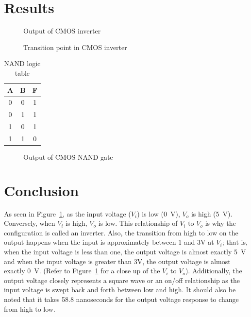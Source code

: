 \newpage

\section{Results}
\label{sec:results}

\begin{figure}[hbtp]
  \centering
  \resizebox{1.0\textwidth}{!}{}
  \caption{\label{fig:inverter} Output of CMOS inverter}
\end{figure}

\begin{figure}[hbtp]
  \centering
  \resizebox{1.0\textwidth}{!}{}
  \caption{\label{fig:data2} Transition point in CMOS inverter}
\end{figure}


\begin{table}[hbtp]
  \centering
  \begin{tabular}{cc|c}
    A & B & F \\
    \hline
    0 & 0 & 1 \\
    0 & 1 & 1 \\
    1 & 0 & 1 \\
    1 & 1 & 0 \\
  \end{tabular}
  \caption{\label{tab:nand} NAND logic table}
  \end{table}

\begin{figure}[hbtp]
  \centering
  \resizebox{1.0\textwidth}{!}{}
  \caption{\label{fig:nand} Output of CMOS NAND gate}
\end{figure}

\newpage

\section{Conclusion}
\label{sec:conclusion}

As seen in Figure~\ref{fig:inverter}, as the input voltage ($V_i$) is low (\SI{0}{V}), $V_o$ is high (\SI{5}{V}).  Conversely, when $V_i$ is high, $V_o$ is low. This relationship of $V_i$ to $V_o$ is why the configuration is called an inverter.  Also, the transition from high to low on the output happens when the input is approximately between 1 and 3V at $V_i$; that is, when the input voltage is less than one, the output voltage is almost exactly \SI{5}{V} and when the input voltage is greater than 3V, the output voltage is almost exactly \SI{0}{V}.  (Refer to Figure~\ref{fig:inverter} for a close up of the $V_i$ to $V_o$).  Additionally, the output voltage closely represents a square wave or an on/off relationship as the input voltage is swept back and forth between low and high.  It should also be noted that it takes 58.8 nanoseconds for the output voltage response to change from high to low.

